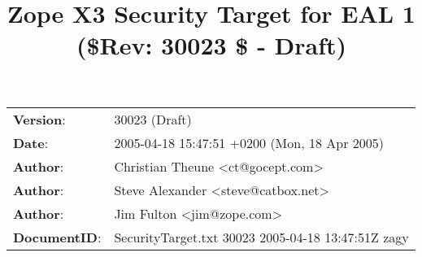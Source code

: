 \documentclass[10pt,a4paper,english]{article}
\title{Zope X3 Security Target for EAL 1 ({\$}Rev: 30023 {\$} - Draft)}
\author{}
\date{}
\newlength{\docinfowidth}
\newlength{\locallinewidth}
\begin{document}
\maketitle

\begin{center}
\begin{tabularx}{\docinfowidth}{lX}
\textbf{Version}: &
	30023 (Draft) \\
\textbf{Date}: &
	2005-04-18 15:47:51 +0200 (Mon, 18 Apr 2005) \\
\textbf{Author}: &
	Christian Theune {\textless}ct@gocept.com{\textgreater} \\
\textbf{Author}: &
	Steve Alexander {\textless}steve@catbox.net{\textgreater} \\
\textbf{Author}: &
	Jim Fulton {\textless}jim@zope.com{\textgreater} \\
\textbf{DocumentID}: &
	SecurityTarget.txt 30023 2005-04-18 13:47:51Z zagy \\
\end{tabularx}
\end{center}

\setlength{\locallinewidth}{\linewidth}

\hypertarget{contents}{}
\end{document}
